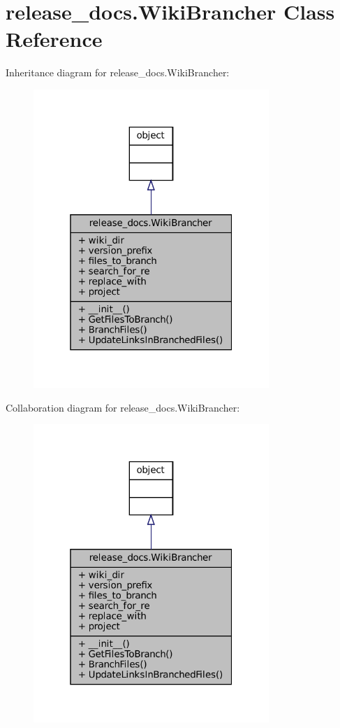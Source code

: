 \hypertarget{classrelease__docs_1_1WikiBrancher}{}\section{release\+\_\+docs.\+Wiki\+Brancher Class Reference}
\label{classrelease__docs_1_1WikiBrancher}


Inheritance diagram for release\+\_\+docs.\+Wiki\+Brancher\+:
\nopagebreak
\begin{figure}[H]
\begin{center}
\leavevmode
\includegraphics[width=253pt]{classrelease__docs_1_1WikiBrancher__inherit__graph}
\end{center}
\end{figure}


Collaboration diagram for release\+\_\+docs.\+Wiki\+Brancher\+:
\nopagebreak
\begin{figure}[H]
\begin{center}
\leavevmode
\includegraphics[width=253pt]{classrelease__docs_1_1WikiBrancher__coll__graph}
\end{center}
\end{figure}

